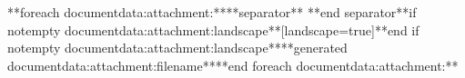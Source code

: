 \documentclass{scrartcl}
\begin{document}

	
	**foreach documentdata:attachment:****separator** **end separator**\*if notempty documentdata:attachment:landscape**[landscape=true]**end if notempty documentdata:attachment:landscape**{**generated documentdata:attachment:filename**}**end foreach documentdata:attachment:**
\end{document}
